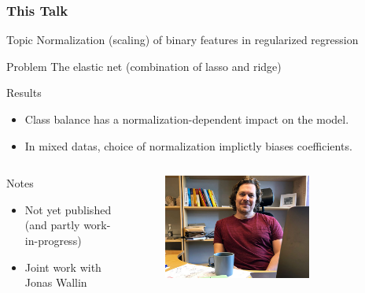 \documentclass[10pt]{beamer}
\begin{document}
\begin{frame}[c]
  \frametitle{This Talk}

  \begin{block}{Topic}
    Normalization (scaling) of binary features in regularized regression
  \end{block}

  \pause

  \begin{alertblock}{Problem}
    The elastic net (combination of lasso and ridge)
  \end{alertblock}

  \pause

  \begin{exampleblock}{Results}
    \begin{itemize}
      \item Class balance has a normalization-dependent impact on the model.
      \item In mixed datas, choice of normalization implictly biases coefficients.
    \end{itemize}
  \end{exampleblock}

  \pause

  \begin{columns}[T]
    \begin{column}{0.45\textwidth}
      \begin{block}{Notes}
        \begin{itemize}
          \item Not yet published (and partly work-in-progress)
          \item Joint work with Jonas Wallin
        \end{itemize}
      \end{block}

    \end{column}
    \begin{column}{0.45\textwidth}
      \begin{figure}
        \hfill%
        \includegraphics[width=0.7\textwidth]{figures/jonas.jpg}
      \end{figure}
    \end{column}
  \end{columns}
\end{frame}
\end{document}
